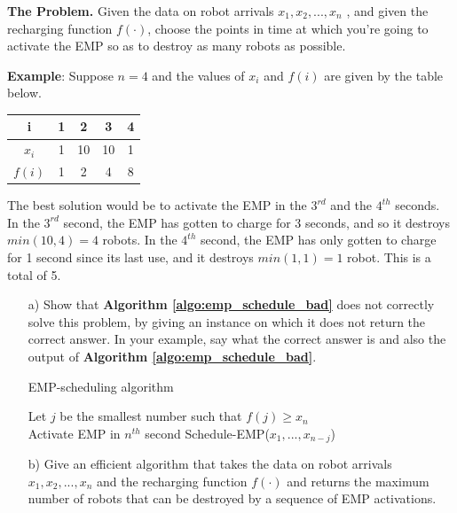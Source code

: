 \documentclass[letter,11pt]{article}
\begin{document}
{\bf The Problem.} Given the data on robot arrivals $x_1, x_2 , ..., x_n$ , and given the recharging function $f(\cdot)$, choose the points in time at which you're going to activate the EMP so as to destroy as many robots as possible.

\textbf{Example}: Suppose $n=4$ and the values of $x_i$ and $f(i)$ are given by the table below.

\begin{center}
\begin{tabular}{|c|c|c|c|c|}
    \hline
    i & 1 & 2 & 3 & 4 \\
    \hline
    $x_i$ & 1 & 10 & 10 & 1 \\
    $f(i)$ & 1 & 2 & 4 & 8 \\
    \hline
\end{tabular}
\end{center}

The best solution would be to activate the EMP in the $3^{rd}$ and the $4^{th}$ seconds. In the $3^{rd}$ second, the EMP has gotten to charge for 3 seconds, and so it destroys $min(10, 4) = 4$ robots. In the $4^{th}$ second, the EMP has only gotten to charge for 1 second since its last use, and it destroys $min(1, 1) = 1$
robot. This is a total of 5.

\begin{enumerate}
    \item[a)] Show that {\bf Algorithm \ref{algo:emp_schedule_bad}} does not correctly solve this problem,
    by giving an instance on which it does not return the correct answer.
    In your example, say what the correct answer is and also the output of {\bf Algorithm \ref{algo:emp_schedule_bad}}.

    \begin{algorithm}
        \caption{EMP-scheduling algorithm}
        \begin{algorithmic}
                \State Let $j$ be the smallest number such that $f(j) \geq x_n$ \\
                \State Activate EMP in $n^{th}$ second
                    \State Schedule-EMP($x_1, ..., x_{n-j}$)
                \EndIf
            \EndFunction
          \end{algorithmic}
          \label{algo:emp_schedule_bad}
    \end{algorithm}


  \item[b)] Give an efficient algorithm that takes the data on robot arrivals $x_1, x_2, ..., x_n$ and the recharging function $f(\cdot)$ and returns the maximum number of robots that can be destroyed by a sequence of EMP activations.


    
\end{enumerate}
\end{document}
